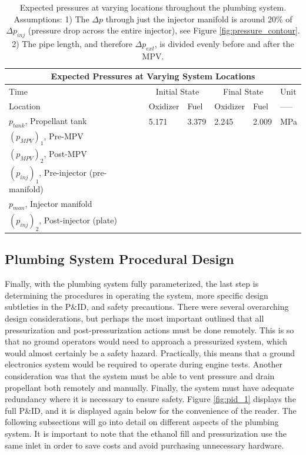 \documentclass[9pt]{article} %
\numberwithin{equation}{section} %
\begin{document}
\begin{table}[!htb]
\centering
\begin{tabular}{ |p{5.5cm}||p{1.5cm}|p{1.5cm}|p{1.5cm}|p{1.5cm}|p{1cm}| }
\hline
\multicolumn{6}{|c|}{Expected Pressures at Varying System Locations} \\
\hline
Time & \multicolumn{2}{|c|}{Initial State} & \multicolumn{2}{|c|}{Final State} & Unit \\ 
\hline
Location & Oxidizer & Fuel & Oxidizer & Fuel & ----- \\
\hline
$p_{tank}$, Propellant tank & 5.171 & 3.379 & 2.245 & 2.009 & MPa \\
$(p_{MPV})_{1}$, Pre-MPV & & & & & \\
$(p_{MPV})_{2}$, Post-MPV & & & & & \\
$(p_{inj})_{1}$, Pre-injector (pre-manifold) & & & & & \\
$p_{man}$, Injector manifold & & & & & \\
$(p_{inj})_{2}$, Post-injector (plate) & & & & & \\
\hline
\end{tabular}
\caption{Expected pressures at varying locations throughout the plumbing system. Assumptions: 1) The $\Delta p$ through just the injector manifold is around 20\% of $\Delta p_{inj}$ (pressure drop across the entire injector), see Figure \ref{fig:pressure_contour}. 2) The pipe length, and therefore $\Delta p_{ext}$, is divided evenly before and after the MPV.}
\label{table:piping_system_expected_pressures}
\end{table}

\subsection{Plumbing System Procedural Design}
\hspace{\parindent} Finally, with the plumbing system fully parameterized, the last step is determining the procedures in operating the system, more specific design subtleties in the P\&ID, and safety precautions. There were several overarching design considerations, but perhaps the most important outlined that all pressurization and post-pressurization actions must be done remotely. This is so that no ground operators would need to approach a pressurized system, which would almost certainly be a safety hazard. Practically, this means that a ground electronics system would be required to operate during engine tests. Another consideration was that the system must be able to vent pressure and drain propellant both remotely and manually. Finally, the system must have adequate redundancy where it is necessary to ensure safety. Figure \ref{fig:pid_1} displays the full P\&ID, and it is displayed again below for the convenience of the reader. The following subsections will go into detail on different aspects of the plumbing system. It is important to note that the ethanol fill and pressurization use the same inlet in order to save costs and avoid purchasing unnecessary hardware.
\end{document}
